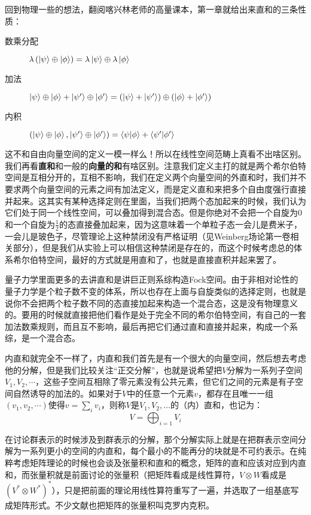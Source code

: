 回到物理一些的想法，翻阅喀兴林老师的高量课本，第一章就给出来直和的三条性质：
\begin{description}
	\item[数乘分配]$\lambda \left(\ket{\psi}\oplus\ket{\phi}\right)=\lambda\ket{\psi}\oplus\lambda\ket{\phi}$
	\item[加法] $\ket{\psi}\oplus\ket{\phi}+\ket{\psi^\prime}\oplus\ket{\phi^\prime}=\left(\ket{\psi}+\ket{\psi^\prime}\right)\oplus\left(\ket{\phi}+\ket{\phi^\prime}\right)$
	\item[内积]$\left(\ket{\psi}\oplus\ket{\phi},\ket{\psi^\prime}\oplus\ket{\phi^\prime}\right)=\braket{\psi}{\phi}+\braket{\psi^\prime}{\phi^\prime}$
\end{description}
这不和自由向量空间的定义一模一样么！所以在线性空间范畴上真看不出啥区别。我们再看\textbf{直和}和一般的\textbf{向量的和}有啥区别。注意我们定义主打的就是两个希尔伯特空间是互相分开的，互相不影响，我们在定义两个向量空间的外直和时，我们并不要求两个向量空间的元素之间有加法定义，而是定义直和来把多个自由度强行直接并起来。这其实有某种选择定则在里面，当我们把两个态加起来的时候，我们认为它们处于同一个线性空间，可以叠加得到混合态。但是你绝对不会把一个自旋为0和一个自旋为$\frac12$的态直接叠加起来，因为这意味着一个单粒子态一会儿是费米子，一会儿是玻色子，尽管理论上这种禁闭没有严格证明（见Weinberg场论第一卷相关部分），但是我们从实验上可以相信这种禁闭是存在的，而这个时候考虑总的体系希尔伯特空间，最好的方式就是用直和了，也就是直接直积并起来罢了。

量子力学里面更多的去讲直和是讲巨正则系综构造Fock空间。由于非相对论性的量子力学是个粒子数不变的体系，所以也存在上面与自旋类似的选择定则，也就是说你不会把两个粒子数不同的态直接加起来构造一个混合态，这是没有物理意义的。要用的时候就直接把他们看作是处于完全不同的希尔伯特空间，有自己的一套加法数乘规则，而且互不影响，最后再把它们通过直和直接并起来，构成一个系综，是一个混合态。

内直和就完全不一样了，内直和我们首先是有一个很大的向量空间，然后想去考虑他的分解，但是我们比较关注“正交分解”，也就是说希望把$V$分解为一系列子空间$V_1,V_2,\cdots$，这些子空间互相除了零元素没有公共元素，但它们之间的元素是有子空间自然诱导的加法的。如果对于$V$中的任意一个元素$v$，都存在且唯一一组$(v_1,v_2,\cdots)$使得$v=\sum_i v_i$，则称$V$是$V_1,V_2,\ldots$的（内）直和，也记为：
\begin{equation}
	V=\bigoplus_{i=1} V_i
\end{equation}

在讨论群表示的时候涉及到群表示的分解，那个分解实际上就是在把群表示空间分解为一系列更小的空间的内直和，每个最小的不能再分的块就是不可约表示。在纯粹考虑矩阵理论的时候也会谈及张量积和直和的概念，矩阵的直和应该对应到内直和，而张量积就是前面讨论的张量积（把矩阵看成是线性算符，$V\otimes W$看成是$(V^*\otimes W^*)^*$），只是把前面的理论用线性算符重写了一遍，并选取了一组基底写成矩阵形式。不少文献也把矩阵的张量积叫克罗内克积。